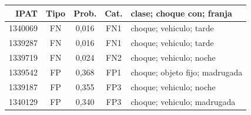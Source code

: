 \begin{tabular}{@{}rcccl@{}}
\toprule
IPAT & Tipo & Prob. & Cat. & clase; choque con; franja \\
\midrule
1340069 & FN & 0,016 & FN1 & choque; vehiculo; tarde \\
1339287 & FN & 0,016 & FN1 & choque; vehiculo; tarde \\
1339719 & FN & 0,024 & FN2 & choque; vehiculo; noche \\
1339542 & FP & 0,368 & FP1 & choque; objeto fijo; madrugada \\
1339187 & FP & 0,355 & FP3 & choque; vehiculo; noche \\
1340129 & FP & 0,340 & FP3 & choque; vehiculo; madrugada \\
\bottomrule
\end{tabular}
